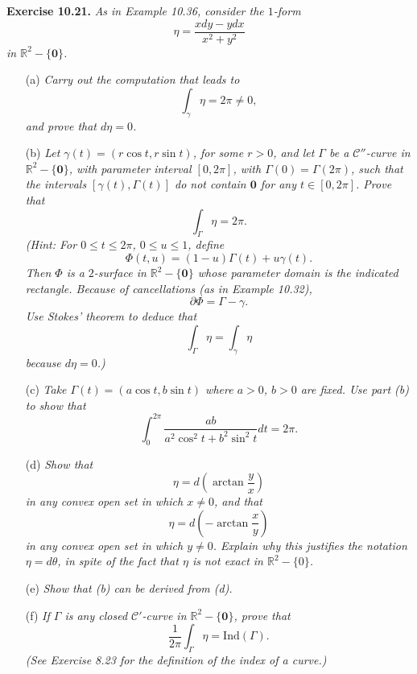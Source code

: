 \documentclass{article}
\begin{document}



\textbf{Exercise 10.21.}
\emph{As in Example 10.36, consider the $1$-form
\[
  \eta = \frac{x dy - y dx}{x^2+y^2}
\]
in $\mathbb{R}^2-\{\mathbf{0}\}$.}
\begin{enumerate}
\item[(a)]
  \emph{Carry out the computation that leads to
  \[
    \int_{\gamma} \eta = 2\pi \neq 0,
  \]
  and prove that $d\eta = 0$.}

\item[(b)]
  \emph{Let $\gamma(t) = (r \cos t, r \sin t)$, for some $r > 0$,
  and let $\Gamma$ be a $\mathscr{C}''$-curve in $\mathbb{R}^2 - \{\mathbf{0}\}$,
  with parameter interval $[0,2\pi]$,
  with $\Gamma(0) = \Gamma(2\pi)$,
  such that the intervals $[\gamma(t),\Gamma(t)]$ do not contain $\mathbf{0}$
  for any $t \in [0,2\pi]$.
  Prove that
  \[
    \int_{\Gamma} \eta = 2\pi.
  \]
  (Hint: For $0 \leq t \leq 2\pi$, $0 \leq u \leq 1$, define
  \[
    \Phi(t,u) = (1-u)\Gamma(t) + u\gamma(t).
  \]
  Then $\Phi$ is a $2$-surface in $\mathbb{R}^2 - \{\mathbf{0}\}$
  whose parameter domain is the indicated rectangle.
  Because of cancellations (as in Example 10.32),
  \[
    \partial \Phi = \Gamma - \gamma.
  \]
  Use Stokes' theorem to deduce that
  \[
    \int_{\Gamma} \eta = \int_{\gamma} \eta
  \]
  because $d\eta = 0$.)}

\item[(c)]
  \emph{Take $\Gamma(t) = (a\cos t, b\sin t)$ where $a > 0$, $b > 0$ are fixed.
  Use part (b) to show that}
  \[
    \int_{0}^{2\pi} \frac{ab}{a^2\cos^2 t + b^2 \sin^2 t}dt = 2\pi.
  \]

\item[(d)]
  \emph{Show that
  \[
    \eta = d\left( \arctan\frac{y}{x} \right)
  \]
  in any convex open set in which $x \neq 0$, and that
  \[
    \eta = d\left( -\arctan\frac{x}{y} \right)
  \]
  in any convex open set in which $y \neq 0$.
  Explain why this justifies the notation $\eta = d\theta$,
  in spite of the fact that $\eta$ is not exact in $\mathbb{R}^2 - \{0\}$.}

\item[(e)]
  \emph{Show that (b) can be derived from (d).}

\item[(f)]
  \emph{If $\Gamma$ is any closed $\mathscr{C}'$-curve in $\mathbb{R}^2 - \{ \mathbf{0} \}$,
  prove that
  \[
    \frac{1}{2\pi} \int_{\Gamma} \eta = \mathrm{Ind}(\Gamma).
  \]
  (See Exercise 8.23 for the definition of the index of a curve.)} \\
\end{enumerate}
\end{document}
